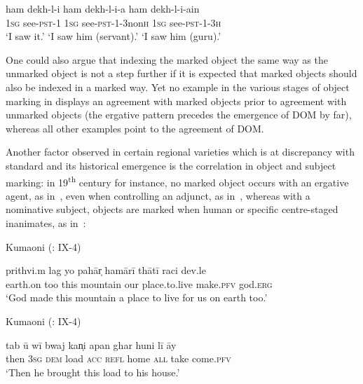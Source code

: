 \documentclass[output=paper]{LSP/langsci}
\begin{document}
\ea {} \citep{Verma1991Exploring}

\label{10-mo-ex:47}
\gll ham dekh-l-i ham dekh-l-i-a ham dekh-l-i-ain\\
 1\textsc{sg} see-\textsc{pst}-1 1\textsc{sg} see-\textsc{pst}-1-3non\textsc{h} 1\textsc{sg} see-\textsc{pst}-1-3\textsc{h}\\
\glt ‘I saw it.’ ‘I saw him (servant).’ ‘I saw him (guru).’ 
\z

One could also argue that indexing the marked object the same way as the unmarked object is not a step further if it is expected that marked objects should also be indexed in a marked way. Yet no example in the various stages of object marking in  displays an agreement with marked objects prior to agreement with unmarked objects (the ergative pattern precedes the emergence of DOM by far), whereas all other examples point to the agreement  of DOM. 

Another factor observed in certain regional varieties which is at discrepancy with standard  and its historical emergence is the correlation in object and subject marking: in 19\textsuperscript{th} century  for instance, no marked object occurs with an ergative agent, as in~, even when controlling an adjunct, as in~, whereas with a nominative subject, objects are marked when human or specific centre-staged inanimates, as in~:


\ea Kumaoni (\citealt{Grierson1903Linguistic}: IX-4) \label{10-mo-ex:49}

\gll prithvi.m lag yo pahār̩ hamārī thātī raci dev.le\\
 earth.on too this mountain our place.to.live make.\textsc{pfv} god.\textsc{erg}\\
\glt ‘God made this mountain a place to live for us on earth too.’
\z

\ea Kumaoni (\citealt{Grierson1903Linguistic}: IX-4) \label{10-mo-ex:50}

\gll tab ū wī bwaj kan̩i apan ghar huni lī āy\\
 then \textsc{3sg} \textsc{dem} load \textsc{acc} \textsc{refl} home \textsc{all} take come.\textsc{pfv}\\
\glt ‘Then he brought this load to his house.’
\z
\end{document}

